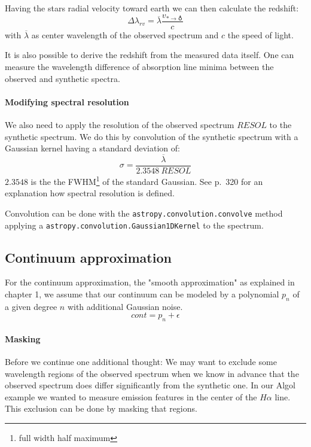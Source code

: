 \documentclass[10pt,a4paper,notitlepage,twocolumn]{article}
\begin{document}
Having the stars radial velocity toward earth we can then calculate the redshift:
\begin{equation}
	\label{eq:dl}
	\Delta\lambda_{rv} = \overline{\lambda} \frac{v_{* \rightarrow \earth}}{c}
\end{equation}
with $\overline{\lambda}$ as center wavelength of the observed spectrum and $c$ the speed of light.

It is also possible to derive the redshift from the measured data itself.
One can measure the wavelength difference of absorption line minima between the observed and synthetic spectra.

\paragraph{Modifying spectral resolution}
We also need to apply the resolution of the observed spectrum $RESOL$ to the synthetic spectrum.
We do this by convolution of the synthetic spectrum with a Gaussian kernel having a standard deviation of:
\begin{equation}
	\sigma = \frac{\overline{\lambda}}{2.3548\ RESOL}
\end{equation}
$2.3548$ is the the FWHM\footnote{full width half maximum} of the standard Gaussian. See \cite{SablowskiSchanne2018} p.\ 320 for an explanation how spectral resolution is defined.

Convolution can be done with the \verb|astropy.convolution.convolve| method applying a \verb|astropy.convolution.Gaussian1DKernel| to the spectrum.

\subsection{Continuum approximation}

For the continuum approximation, the "smooth approximation" as explained in chapter 1, we assume that our continuum can be modeled by a polynomial $p_n$ of a given degree $n$ with additional Gaussian noise.
\begin{equation}
	\label{eq:cont_model}
	cont = p_n + \epsilon
\end{equation}

\paragraph{Masking}
Before we continue one additional thought:
We may want to exclude some wavelength regions of the observed spectrum when we know in advance that the observed spectrum does differ significantly from the synthetic one.
In our Algol example we wanted to measure emission features in the center of the $H\alpha$ line.
This exclusion can be done by masking that regions.
\end{document}
